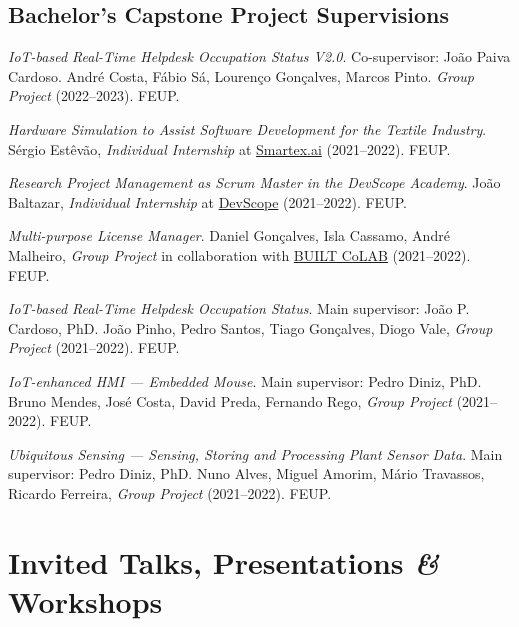 \documentclass[10pt, a4paper]{article}
\newcommand{\feup}{FEUP}
\let\oldhref\href
\renewcommand{\href}[2]{\oldhref{#1}{{\small #2}}}
\begin{document}
\subsection*{Bachelor's Capstone Project Supervisions}

\begin{etaremune}
	\renewcommand\labelenumi{\footnotesize\theenumi .}
 \item \textit{IoT-based Real-Time Helpdesk Occupation Status V2.0}. Co-supervisor: João Paiva Cardoso. André Costa, Fábio Sá, Lourenço Gonçalves, Marcos Pinto. \textit{Group Project} (2022--2023). \feup.
	\item \textit{Hardware Simulation to Assist Software Development for the Textile Industry}. Sérgio Estêvão, \textit{Individual Internship} at \href{https://www.smartex.ai/}{Smartex.ai} (2021--2022). \feup. 
	\item \textit{Research Project Management as Scrum Master in the DevScope Academy}. João Baltazar, \textit{Individual Internship} at \href{https://www.devscope.net/}{DevScope} (2021--2022). \feup. 
	
	\item \textit{Multi-purpose License Manager}. Daniel Gonçalves, Isla Cassamo, André Malheiro, \textit{Group Project} in collaboration with \href{https://www.builtcolab.pt/}{BUILT CoLAB} (2021--2022). \feup.
	
	\item \textit{IoT-based Real-Time Helpdesk Occupation Status}. Main supervisor: João P. Cardoso, PhD. João Pinho, Pedro Santos, Tiago Gonçalves, Diogo Vale, \textit{Group Project} (2021--2022). \feup.
	
	\item \textit{IoT-enhanced HMI --- Embedded Mouse}. Main supervisor: Pedro Diniz, PhD. Bruno Mendes, José Costa, David Preda, Fernando Rego, \textit{Group Project} (2021--2022). \feup.
	
	\item \textit{Ubiquitous Sensing --- Sensing, Storing and Processing Plant Sensor Data}. Main supervisor: Pedro Diniz, PhD. Nuno Alves, Miguel Amorim, Mário Travassos, Ricardo Ferreira, \textit{Group Project} (2021--2022). \feup.
\end{etaremune}

\section*{Invited Talks, Presentations \textit{\&} Workshops}
\end{document}
